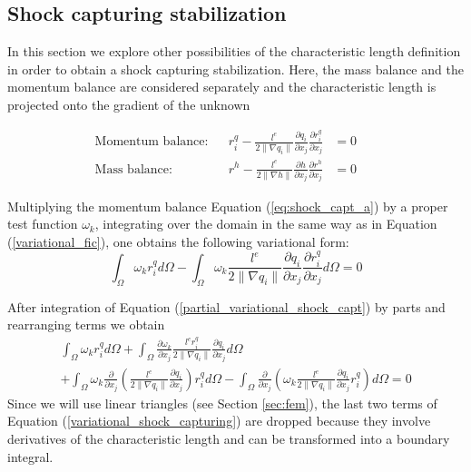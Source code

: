 \documentclass[a4paper,12pt]{elsarticle}
\newcommand{\pder}[2]{\frac{\partial#1}{\partial#2}}
\newcommand{\norm}[1]{\lVert#1\rVert}
\begin{document}
\subsection{Shock capturing stabilization}

In this section we explore other possibilities of the characteristic length definition in order to obtain a shock capturing stabilization. Here, the mass balance and the momentum balance are considered separately and the characteristic length is projected onto the gradient of the unknown

\begin{subequations} \label{eq:shock_capt}
\begin{align}
\text{Momentum balance:} &&
    r_i^q - \frac{l^e}{2\norm{\nabla q_i}}\pder{q_i}{x_j}\pder{r_i^q}{x_j} &= 0 \label{eq:shock_capt_a} && \\ 
\text{Mass balance:} &&
    r^h - \frac{l^e}{2\norm{\nabla h}} \pder{h}{x_j} \pder{r^h}{x_j} &=0 \label{eq:shock_capt_b}
\end{align}
\end{subequations}

Multiplying the momentum balance Equation (\ref{eq:shock_capt_a}) by a proper test function $\omega_k$, integrating over the domain in the same way as in Equation (\ref{variational_fic}),
one obtains the following variational form:
\begin{equation}
    \int_\Omega \omega_k r_i^q d\Omega
     - \int_\Omega \omega_k \frac{l^e}{2\norm{\nabla q_i}}\pder{q_i}{x_j}\pder{r_i^q}{x_j}
     d\Omega = 0
    \label{partial_variational_shock_capt}
\end{equation}

After integration of Equation (\ref{partial_variational_shock_capt}) by parts and rearranging terms we obtain
\begin{multline}
    \int_\Omega \omega_k r_i^q d\Omega 
    + \int_\Omega \pder{\omega_k}{x_j}
        \frac{l^e r_i^q}{2\norm{\nabla q_i}}\pder{q_i}{x_j} d\Omega \\
    + \int_\Omega \omega_k \pder{}{x_j}\left(
         \frac{l^e}{2\norm{\nabla q_i}}\pder{q_i}{x_j}
        \right)r_i^q d\Omega 
    - \int_\Omega \pder{}{x_j}\left(
        \omega_k \frac{l^e}{2\norm{\nabla q_i}}\pder{q_i}{x_j}r_i^q \right) d\Omega
        = 0
        \label{variational_shock_capturing}
\end{multline}
Since we will use linear triangles (see Section \ref{sec:fem}),
the last two terms of Equation (\ref{variational_shock_capturing}) are dropped because they involve derivatives of the characteristic length and can be transformed into a boundary integral.
\end{document}
